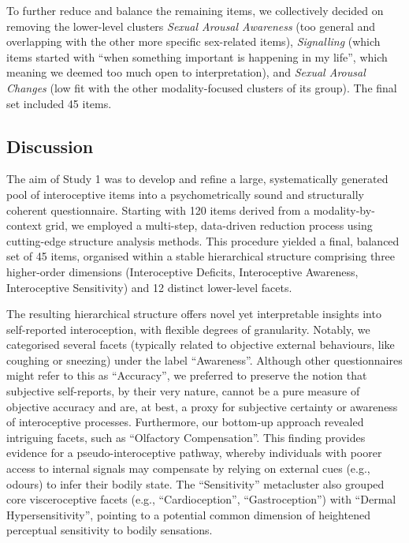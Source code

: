 \documentclass[
  jou,
  floatsintext,
  longtable,
  nolmodern,
  notxfonts,
  notimes,
  colorlinks=true,linkcolor=blue,citecolor=blue,urlcolor=blue]{apa7}
\begin{document}
To further reduce and balance the remaining items, we collectively
decided on removing the lower-level clusters \emph{Sexual Arousal
Awareness} (too general and overlapping with the other more specific
sex-related items), \emph{Signalling} (which items started with ``when
something important is happening in my life'', which meaning we deemed
too much open to interpretation), and \emph{Sexual Arousal Changes} (low
fit with the other modality-focused clusters of its group). The final
set included 45 items.

\subsection{Discussion}\label{discussion}

The aim of Study 1 was to develop and refine a large, systematically
generated pool of interoceptive items into a psychometrically sound and
structurally coherent questionnaire. Starting with 120 items derived
from a modality-by-context grid, we employed a multi-step, data-driven
reduction process using cutting-edge structure analysis methods. This
procedure yielded a final, balanced set of 45 items, organised within a
stable hierarchical structure comprising three higher-order dimensions
(Interoceptive Deficits, Interoceptive Awareness, Interoceptive
Sensitivity) and 12 distinct lower-level facets.

The resulting hierarchical structure offers novel yet interpretable
insights into self-reported interoception, with flexible degrees of
granularity. Notably, we categorised several facets (typically related
to objective external behaviours, like coughing or sneezing) under the
label ``Awareness''. Although other questionnaires might refer to this
as ``Accuracy'', we preferred to preserve the notion that subjective
self-reports, by their very nature, cannot be a pure measure of
objective accuracy and are, at best, a proxy for subjective certainty or
awareness of interoceptive processes. Furthermore, our bottom-up
approach revealed intriguing facets, such as ``Olfactory Compensation''.
This finding provides evidence for a pseudo-interoceptive pathway,
whereby individuals with poorer access to internal signals may
compensate by relying on external cues (e.g., odours) to infer their
bodily state. The ``Sensitivity'' metacluster also grouped core
visceroceptive facets (e.g., ``Cardioception'', ``Gastroception'') with
``Dermal Hypersensitivity'', pointing to a potential common dimension of
heightened perceptual sensitivity to bodily sensations.
\end{document}
